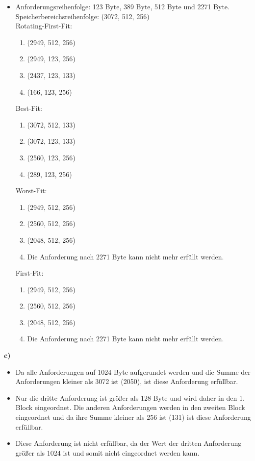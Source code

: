 \documentclass[a4paper,graphics,11pt]{article}
\begin{document}
\begin{itemize}
        \item   Anforderungsreihenfolge: 123 Byte, 389 Byte, 512 Byte und 2271 Byte.\\
                Speicherbereichsreihenfolge: (3072, 512, 256)\\
                Rotating-First-Fit:
                \begin{enumerate}
                    \item (2949, 512, 256)
                    \item (2949, 123, 256)
                    \item (2437, 123, 133)
                    \item (166, 123, 256)
                \end{enumerate}
                Best-Fit:
                \begin{enumerate}
                    \item (3072, 512, 133)
                    \item (3072, 123, 133)
                    \item (2560, 123, 256)
                    \item (289, 123, 256)
                \end{enumerate}
                Worst-Fit:
                \begin{enumerate}
                    \item (2949, 512, 256)
                    \item (2560, 512, 256)
                    \item (2048, 512, 256)
                    \item Die Anforderung nach 2271 Byte kann nicht mehr erfüllt werden.
                \end{enumerate}
                First-Fit:
                \begin{enumerate}
                    \item (2949, 512, 256)
                    \item (2560, 512, 256)
                    \item (2048, 512, 256)
                    \item Die Anforderung nach 2271 Byte kann nicht mehr erfüllt werden.
                \end{enumerate}
\end{itemize}

\textbf{c)}

\begin{itemize}
    \item Da alle Anforderungen auf 1024 Byte aufgerundet werden und die Summe der Anforderungen kleiner als 3072 ist (2050), ist diese Anforderung erfüllbar.
    \item Nur die dritte Anforderung ist größer als 128 Byte und wird daher in den 1. Block eingeordnet. Die anderen Anforderungen werden in den zweiten Block eingeordnet und da ihre Summe kleiner als 256 ist (131) ist diese Anforderung erfüllbar.
    \item Diese Anforderung ist nicht erfüllbar, da der Wert der dritten Anforderung größer als 1024 ist und somit nicht eingeordnet werden kann.
\end{itemize}
\end{document}
